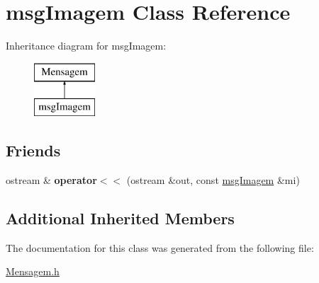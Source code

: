 \hypertarget{classmsg_imagem}{}\section{msg\+Imagem Class Reference}
\label{classmsg_imagem}
Inheritance diagram for msg\+Imagem\+:\begin{figure}[H]
\begin{center}
\leavevmode
\includegraphics[height=2.000000cm]{classmsg_imagem}
\end{center}
\end{figure}
\subsection*{Friends}
\begin{DoxyCompactItemize}
\item 
\hypertarget{classmsg_imagem_aefff2572986b0f2dab85586b30162935}{}ostream \& {\bfseries operator$<$$<$} (ostream \&out, const \hyperlink{classmsg_imagem}{msg\+Imagem} \&mi)\label{classmsg_imagem_aefff2572986b0f2dab85586b30162935}

\end{DoxyCompactItemize}
\subsection*{Additional Inherited Members}


The documentation for this class was generated from the following file\+:\begin{DoxyCompactItemize}
\item 
\hyperlink{_mensagem_8h}{Mensagem.\+h}\end{DoxyCompactItemize}
